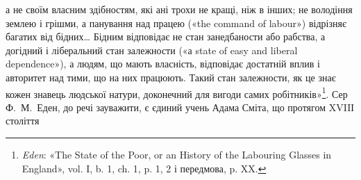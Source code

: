\parcont{}  %
а не своїм власним здібностям, які ані трохи не кращі, ніж в
інших; не володіння землею і грішми, а панування над працею
(«the command of labour») відрізняє багатих від бідних\dots{} Бідним
відповідає не стан занедбаности або рабства, а догідний і
ліберальний стан залежности («а state of easy and liberal dependence»),
а людям, що мають власність, відповідає достатній вплив
і авторитет над тими, що на них працюють. Такий стан залежности,
як це знає кожен знавець людської натури, доконечний
для вигоди самих робітників»\footnote{
\emph{Eden}: «The State of the Poor, or an History of the Labouring Glasses
in England», vol. I, b. 1, ch. 1, p. 1, 2 і передмова, p. XX.
}. Сер Ф.~М.~Еден, до речі зауважити,
є єдиний учень Адама Сміта, що протягом XVIIІ століття
